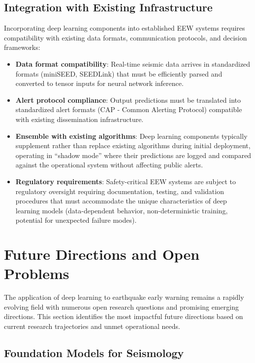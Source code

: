 \documentclass[review,authoryear]{elsarticle}
\begin{document}
\subsection{Integration with Existing Infrastructure}

Incorporating deep learning components into established EEW systems requires compatibility with existing data formats, communication protocols, and decision frameworks:

\begin{itemize}
\item \textbf{Data format compatibility}: Real-time seismic data arrives in standardized formats (miniSEED, SEEDLink) that must be efficiently parsed and converted to tensor inputs for neural network inference.
\item \textbf{Alert protocol compliance}: Output predictions must be translated into standardized alert formats (CAP - Common Alerting Protocol) compatible with existing dissemination infrastructure.
\item \textbf{Ensemble with existing algorithms}: Deep learning components typically supplement rather than replace existing algorithms during initial deployment, operating in ``shadow mode'' where their predictions are logged and compared against the operational system without affecting public alerts.
\item \textbf{Regulatory requirements}: Safety-critical EEW systems are subject to regulatory oversight requiring documentation, testing, and validation procedures that must accommodate the unique characteristics of deep learning models (data-dependent behavior, non-deterministic training, potential for unexpected failure modes).
\end{itemize}


\section{Future Directions and Open Problems}
\label{sec:future}

The application of deep learning to earthquake early warning remains a rapidly evolving field with numerous open research questions and promising emerging directions. This section identifies the most impactful future directions based on current research trajectories and unmet operational needs.

\subsection{Foundation Models for Seismology}
\end{document}
